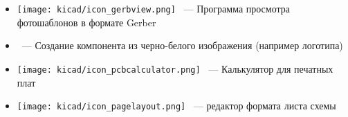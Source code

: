 


\begin{itemize}
\item
\texttt{[image: kicad/icon\_gerbview.png]}
\ --- Программа просмотра фотошаблонов в формате Gerber
\item
{}\ --- Создание компонента из черно-белого изображения
(например логотипа)
\item
\texttt{[image: kicad/icon\_pcbcalculator.png]}
\ --- Калькулятор для печатных плат
\item
\texttt{[image: kicad/icon\_pagelayout.png]}
\ --- редактор формата листа схемы
\end{itemize}


